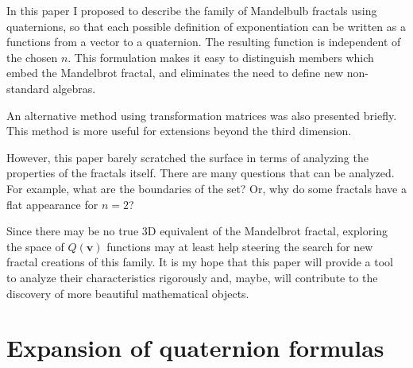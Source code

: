 \documentclass{article}
\let\vec\mathbf
\begin{document}
In this paper I proposed to describe the family of Mandelbulb fractals
using quaternions, so that each possible definition of exponentiation
can be written as a functions from a vector to a quaternion.  The
resulting function is independent of the chosen $n$.  This formulation
makes it easy to distinguish members which embed the Mandelbrot
fractal, and eliminates the need to define new non-standard algebras.

An alternative method using transformation matrices was also presented
briefly.  This method is more useful for extensions beyond the third
dimension.

However, this paper barely scratched the surface in terms of analyzing
the properties of the fractals itself.  There are many questions that
can be analyzed.  For example, what are the boundaries of the set?
Or, why do some fractals have a flat appearance for $n = 2$?

Since there may be no true 3D equivalent of the Mandelbrot fractal,
exploring the space of $Q(\vec{v})$ functions may at least help
steering the search for new fractal creations of this family.  It is
my hope that this paper will provide a tool to analyze their
characteristics rigorously and, maybe, will contribute to the
discovery of more beautiful mathematical objects.

\newpage
\appendix
\section{Expansion of quaternion formulas}
\end{document}
